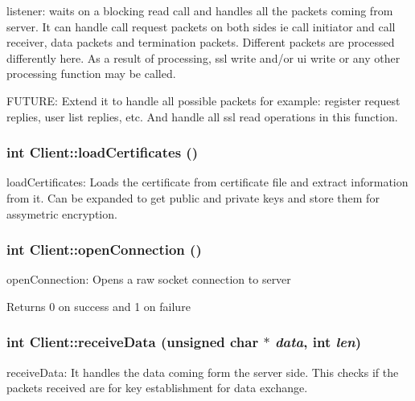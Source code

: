 \label{classClient_a7b83f2c7c0dfdd9022caab642c5f2d7f}
listener: waits on a blocking read call and handles all the packets coming from server. It can handle call request packets on both sides ie call initiator and call receiver, data packets and termination packets. Different packets are processed differently here. As a result of processing, ssl write and/or ui write or any other processing function may be called. 

FUTURE: Extend it to handle all possible packets for example: register request replies, user list replies, etc. And handle all ssl read operations in this function. \hypertarget{classClient_abcdf713583d46487081578612b5f2ae3}{
\subsubsection[{loadCertificates}]{\setlength{\rightskip}{0pt plus 5cm}int Client::loadCertificates ()}}
\label{classClient_abcdf713583d46487081578612b5f2ae3}
loadCertificates: Loads the certificate from certificate file and extract information from it. Can be expanded to get public and private keys and store them for assymetric encryption. \hypertarget{classClient_a5bf20fbae99e62931592728e0763c9d3}{
\subsubsection[{openConnection}]{\setlength{\rightskip}{0pt plus 5cm}int Client::openConnection ()}}
\label{classClient_a5bf20fbae99e62931592728e0763c9d3}
openConnection: Opens a raw socket connection to server

\begin{DoxyReturn}{Returns}
0 on success and 1 on failure 
\end{DoxyReturn}
\hypertarget{classClient_a4a755fe461f77825b30a7a00c1cd9b5c}{
\subsubsection[{receiveData}]{\setlength{\rightskip}{0pt plus 5cm}int Client::receiveData (unsigned char $\ast$ {\em data}, \/  int {\em len})}}
\label{classClient_a4a755fe461f77825b30a7a00c1cd9b5c}
receiveData: It handles the data coming form the server side. This checks if the packets received are for key establishment for data exchange. 

